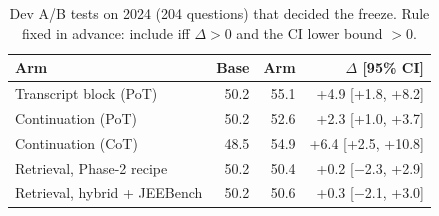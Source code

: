 \begin{table}[!t]
\centering
\footnotesize
\caption{Dev A/B tests on 2024 (204 questions) that decided the freeze. Rule fixed in advance: include iff $\Delta>0$ and the CI lower bound $>0$.}
\label{tab:devab}
\setlength{\tabcolsep}{3.5pt}
\begin{tabular}{lrrr}
\toprule
Arm & Base & Arm & $\Delta$ [95\% CI] \\
\midrule
Transcript block (PoT) & 50.2 & 55.1 & +4.9 [+1.8, +8.2] \\
Continuation (PoT) & 50.2 & 52.6 & +2.3 [+1.0, +3.7] \\
Continuation (CoT) & 48.5 & 54.9 & +6.4 [+2.5, +10.8] \\
Retrieval, Phase-2 recipe & 50.2 & 50.4 & +0.2 [$-$2.3, +2.9] \\
Retrieval, hybrid + JEEBench & 50.2 & 50.6 & +0.3 [$-$2.1, +3.0] \\
\bottomrule
\end{tabular}
\end{table}
